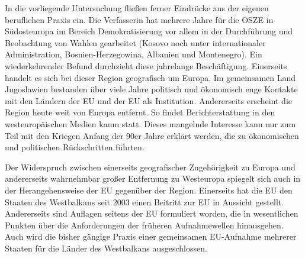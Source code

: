 In die vorliegende Untersuchung fließen ferner Eindrücke aus der eigenen beruflichen Praxis ein. Die Verfasserin hat mehrere Jahre für die OSZE in Südosteuropa im Bereich Demokratisierung vor allem in der Durchführung und Beobachtung von Wahlen gearbeitet (Kosovo noch unter internationaler Administration, Bosnien-Herzegowina, Albanien und Montenegro). Ein wiederkehrender Befund durchzieht diese jahrelange Beschäftigung. Einerseits handelt es sich bei dieser Region geografisch um Europa. Im gemeinsamen Land Jugoslawien bestanden über viele Jahre politisch und ökonomisch enge Kontakte mit den Ländern der EU und der EU als Institution. Andererseits erscheint die Region heute weit von Europa entfernt. So findet Berichterstattung in den westeuropäischen Medien kaum statt. Dieses mangelnde Interesse kann nur zum Teil mit den Kriegen Anfang der 90er Jahre erklärt werden, die zu ökonomischen und politischen Rückschritten führten.\par
Der Widerspruch zwischen einerseits geografischer Zugehörigkeit zu Europa und andererseits wahrnehmbar großer Entfernung zu Westeuropa spiegelt sich auch in der Herangehensweise der EU gegenüber der Region. Einerseits hat die EU den Staaten des Westbalkans seit 2003 einen Beitritt zur EU in Aussicht gestellt. Andererseits sind Auflagen seitens der EU formuliert worden, die in wesentlichen Punkten über die Anforderungen der früheren Aufnahmewellen hinausgehen. Auch wird die bisher gängige Praxis einer gemeinsamen EU-Aufnahme mehrerer Staaten für die Länder des Westbalkans ausgeschlossen.
